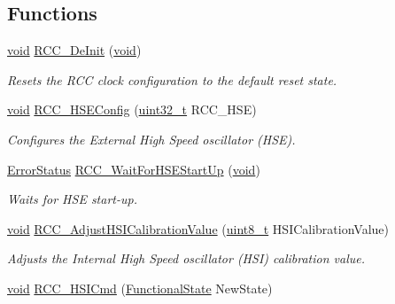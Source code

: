 \subsection*{Functions}
\begin{DoxyCompactItemize}
\item 
\hyperlink{usb__devapi_8h_afabf60e7f57651d6d595a02c75f07cd0}{void} \hyperlink{group___r_c_c___exported___functions_ga413f6422be11b1334abe60b3bff2e062}{R\+C\+C\+\_\+\+De\+Init} (\hyperlink{usb__devapi_8h_afabf60e7f57651d6d595a02c75f07cd0}{void})
\begin{DoxyCompactList}\small\item\em Resets the R\+CC clock configuration to the default reset state. \end{DoxyCompactList}\item 
\hyperlink{usb__devapi_8h_afabf60e7f57651d6d595a02c75f07cd0}{void} \hyperlink{group___r_c_c___exported___functions_ga432b3281546d23345642d55f8670a93d}{R\+C\+C\+\_\+\+H\+S\+E\+Config} (\hyperlink{_p_e___types_8h_a33594304e786b158f3fb30289278f5af}{uint32\+\_\+t} R\+C\+C\+\_\+\+H\+SE)
\begin{DoxyCompactList}\small\item\em Configures the External High Speed oscillator (H\+SE). \end{DoxyCompactList}\item 
\hyperlink{agilefox_2library_2inc_2stm32f10x__type_8h_a8333b96c67f83cba354b3407fcbb6ee8}{Error\+Status} \hyperlink{group___r_c_c___exported___functions_gae0f15692614dd048ee4110a056f001dc}{R\+C\+C\+\_\+\+Wait\+For\+H\+S\+E\+Start\+Up} (\hyperlink{usb__devapi_8h_afabf60e7f57651d6d595a02c75f07cd0}{void})
\begin{DoxyCompactList}\small\item\em Waits for H\+SE start-\/up. \end{DoxyCompactList}\item 
\hyperlink{usb__devapi_8h_afabf60e7f57651d6d595a02c75f07cd0}{void} \hyperlink{group___r_c_c___exported___functions_gaa2d6a35f5c2e0f86317c3beb222677fc}{R\+C\+C\+\_\+\+Adjust\+H\+S\+I\+Calibration\+Value} (\hyperlink{_p_e___types_8h_aba7bc1797add20fe3efdf37ced1182c5}{uint8\+\_\+t} H\+S\+I\+Calibration\+Value)
\begin{DoxyCompactList}\small\item\em Adjusts the Internal High Speed oscillator (H\+SI) calibration value. \end{DoxyCompactList}\item 
\hyperlink{usb__devapi_8h_afabf60e7f57651d6d595a02c75f07cd0}{void} \hyperlink{group___r_c_c___exported___functions_ga0c6772a1e43765909495f57815ef69e2}{R\+C\+C\+\_\+\+H\+S\+I\+Cmd} (\hyperlink{agilefox_2library_2inc_2stm32f10x__type_8h_ac9a7e9a35d2513ec15c3b537aaa4fba1}{Functional\+State} New\+State)

\end{DoxyCompactItemize}
